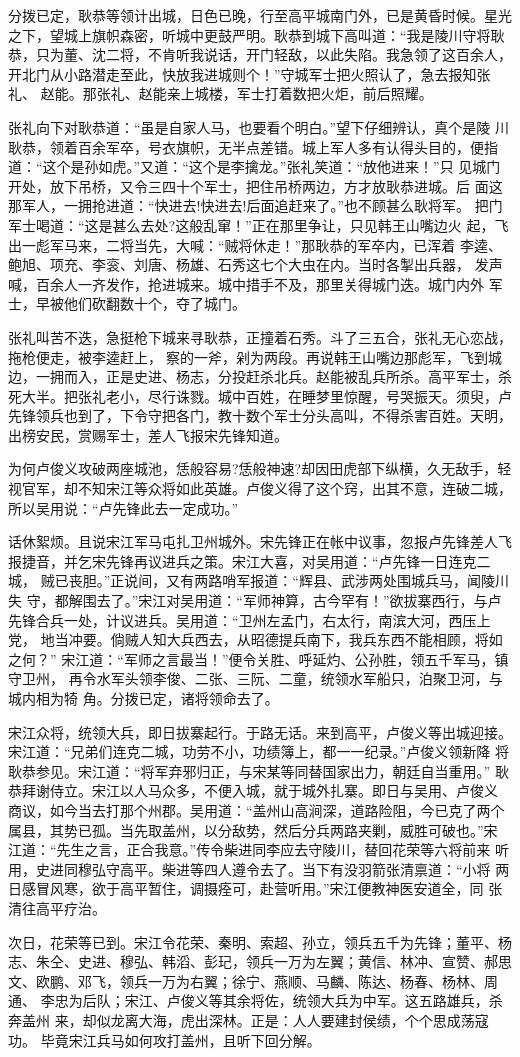 分拨已定，耿恭等领计出城，日色已晚，行至高平城南门外，已是黄昏时候。星光
之下，望城上旗帜森密，听城中更鼓严明。耿恭到城下高叫道：“我是陵川守将耿
恭，只为董、沈二将，不肯听我说话，开门轻敌，以此失陷。我急领了这百余人，
开北门从小路潜走至此，快放我进城则个！”守城军士把火照认了，急去报知张礼、
赵能。那张礼、赵能亲上城楼，军士打着数把火炬，前后照耀。

张礼向下对耿恭道：“虽是自家人马，也要看个明白。”望下仔细辨认，真个是陵
川耿恭，领着百余军卒，号衣旗帜，无半点差错。城上军人多有认得头目的，便指
道：“这个是孙如虎。”又道：“这个是李擒龙。”张礼笑道：“放他进来！”只
见城门开处，放下吊桥，又令三四十个军士，把住吊桥两边，方才放耿恭进城。后
面这那军人，一拥抢进道：“快进去!快进去!后面追赶来了。”也不顾甚么耿将军。
把门军士喝道：“这是甚么去处?这般乱窜！”正在那里争让，只见韩王山嘴边火
起，飞出一彪军马来，二将当先，大喊：“贼将休走！”那耿恭的军卒内，已浑着
李逵、鲍旭、项充、李衮、刘唐、杨雄、石秀这七个大虫在内。当时各掣出兵器，
发声喊，百余人一齐发作，抢进城来。城中措手不及，那里关得城门迭。城门内外
军士，早被他们砍翻数十个，夺了城门。

张礼叫苦不迭，急挺枪下城来寻耿恭，正撞着石秀。斗了三五合，张礼无心恋战，
拖枪便走，被李逵赶上，察的一斧，剁为两段。再说韩王山嘴边那彪军，飞到城
边，一拥而入，正是史进、杨志，分投赶杀北兵。赵能被乱兵所杀。高平军士，杀
死大半。把张礼老小，尽行诛戮。城中百姓，在睡梦里惊醒，号哭振天。须臾，卢
先锋领兵也到了，下令守把各门，教十数个军士分头高叫，不得杀害百姓。天明，
出榜安民，赏赐军士，差人飞报宋先锋知道。

为何卢俊义攻破两座城池，恁般容易?恁般神速?却因田虎部下纵横，久无敌手，轻
视官军，却不知宋江等众将如此英雄。卢俊义得了这个窍，出其不意，连破二城，
所以吴用说：“卢先锋此去一定成功。”

话休絮烦。且说宋江军马屯扎卫州城外。宋先锋正在帐中议事，忽报卢先锋差人飞
报捷音，并乞宋先锋再议进兵之策。宋江大喜，对吴用道：“卢先锋一日连克二城，
贼已丧胆。”正说间，又有两路哨军报道：“辉县、武涉两处围城兵马，闻陵川失
守，都解围去了。”宋江对吴用道：“军师神算，古今罕有！”欲拔寨西行，与卢
先锋合兵一处，计议进兵。吴用道：“卫州左孟门，右太行，南滨大河，西压上党，
地当冲要。倘贼人知大兵西去，从昭德提兵南下，我兵东西不能相顾，将如之何？”
宋江道：“军师之言最当！”便令关胜、呼延灼、公孙胜，领五千军马，镇守卫州，
再令水军头领李俊、二张、三阮、二童，统领水军船只，泊聚卫河，与城内相为犄
角。分拨已定，诸将领命去了。

宋江众将，统领大兵，即日拔寨起行。于路无话。来到高平，卢俊义等出城迎接。
宋江道：“兄弟们连克二城，功劳不小，功绩簿上，都一一纪录。”卢俊义领新降
将耿恭参见。宋江道：“将军弃邪归正，与宋某等同替国家出力，朝廷自当重用。”
耿恭拜谢侍立。宋江以人马众多，不便入城，就于城外扎寨。即日与吴用、卢俊义
商议，如今当去打那个州郡。吴用道：“盖州山高涧深，道路险阻，今已克了两个
属县，其势已孤。当先取盖州，以分敌势，然后分兵两路夹剿，威胜可破也。”宋
江道：“先生之言，正合我意。”传令柴进同李应去守陵川，替回花荣等六将前来
听用，史进同穆弘守高平。柴进等四人遵令去了。当下有没羽箭张清禀道：“小将
两日感冒风寒，欲于高平暂住，调摄痊可，赴营听用。”宋江便教神医安道全，同
张清往高平疗治。

次日，花荣等已到。宋江令花荣、秦明、索超、孙立，领兵五千为先锋；董平、杨
志、朱仝、史进、穆弘、韩滔、彭玘，领兵一万为左翼；黄信、林冲、宣赞、郝思
文、欧鹏、邓飞，领兵一万为右翼；徐宁、燕顺、马麟、陈达、杨春、杨林、周通、
李忠为后队；宋江、卢俊义等其余将佐，统领大兵为中军。这五路雄兵，杀奔盖州
来，却似龙离大海，虎出深林。正是：人人要建封侯绩，个个思成荡寇功。
毕竟宋江兵马如何攻打盖州，且听下回分解。